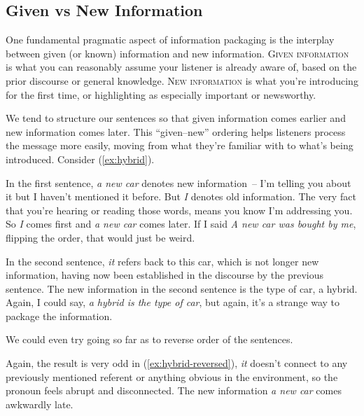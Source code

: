 \subsection{Given vs New Information}

One fundamental pragmatic aspect of information packaging is the interplay between given (or known) information and new information. \textsc{Given information} is what you can reasonably assume your listener is already aware of, based on the prior discourse or general knowledge. \textsc{New information} is what you're introducing for the first time, or highlighting as especially important or newsworthy.

We tend to structure our sentences so that given information comes earlier and new information comes later. This ``given--new'' ordering helps listeners process the message more easily, moving from what they're familiar with to what's being introduced. Consider (\ref{ex:hybrid}).

\label{ex:hybrid}
\z

In the first sentence, \textit{a new car} denotes new information~-- I'm telling you about it but I haven't mentioned it before. But \textit{I} denotes old information. The very fact that you're hearing or reading those words, means you know I'm addressing you. So \textit{I} comes first and \textit{a new car} comes later. If I said \textit{A new car was bought by me}, flipping the order, that would just be weird.

In the second sentence, \textit{it} refers back to this car, which is not longer new information, having now been established in the discourse by the previous sentence. The new information in the second sentence is the type of car, a hybrid. Again, I could say, \textit{a hybrid is the type of car}, but again, it's a strange way to package the information.

We could even try going so far as to reverse order of the sentences.

\label{ex:hybrid-reversed}
\z

Again, the result is very odd in (\ref{ex:hybrid-reversed}), \textit{it} doesn't connect to any previously mentioned referent or anything obvious in the environment, so the pronoun feels abrupt and disconnected. The new information \textit{a new car} comes awkwardly late.

